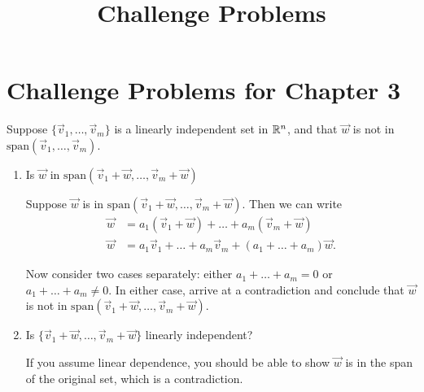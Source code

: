 \documentclass{ximera}
\title{Challenge Problems} \license{CC BY-NC-SA 4.0}
\begin{document}
\begin{abstract}
\end{abstract}
\maketitle

\section*{Challenge Problems for Chapter 3}

\begin{problem}\label{prob:Anna3.1}
    Suppose $\{\vec{v}_{1}, \dots , \vec{v}_{m}\}$ is a linearly independent set in $\mathbb{R}^n$, and that $\vec{w}$ is not in $\mbox{span}\left(\vec{v}_{1}, \dots , \vec{v}_{m}\right)$.

    \begin{enumerate}
        \item Is $\vec{w}$ in $\mbox{span}\left(\vec{v}_{1}+\vec{w}, \dots , \vec{v}_{m}+\vec{w}\right)$

                \begin{hint}
            Suppose $\vec{w}$ is in $\mbox{span}\left(\vec{v}_{1}+\vec{w}, \dots , \vec{v}_{m}+\vec{w}\right)$.  Then we can write
\begin{align*}
    \vec{w} &= a_1 (\vec{v}_{1}+\vec{w}) + \dots + a_m (\vec{v}_{m}+\vec{w}) \\
    \vec{w} &= a_1\vec{v}_{1} + \dots + a_m\vec{v}_{m}+ (a_1 + \dots + a_m)\vec{w}.
    \end{align*}

Now consider two cases separately: either $a_1 + \dots + a_m = 0$ or $a_1 + \dots + a_m \ne 0$.  In either case, arrive at a contradiction and conclude that $\vec{w}$ is not in $\mbox{span}\left(\vec{v}_{1}+\vec{w}, \dots , \vec{v}_{m}+\vec{w}\right)$.
        \end{hint}

\item Is $\{\vec{v}_{1}+\vec{w}, \dots , \vec{v}_{m}+\vec{w}\}$ linearly independent?


\begin{hint}
            If you assume linear dependence, you should be able to show $\vec{w}$ is in the span of the original set, which is a contradiction.
\end{hint}

    \end{enumerate}
\end{problem}
\end{document}
